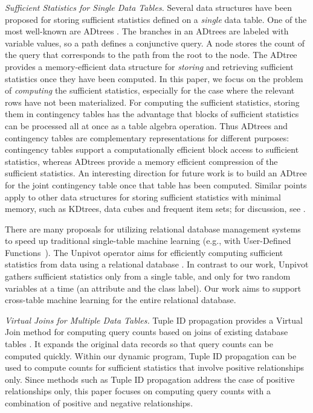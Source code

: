 \documentclass{vldb}
\begin{document}
{\em Sufficient Statistics for Single Data Tables.} Several data structures have been proposed for storing sufficient statistics defined on a {\em single} data table. 
One of the most well-known are ADtrees \cite{Moore1998}. 
The branches in an ADtrees are labeled with variable values, so a path defines a conjunctive query. 
A node stores the count of the query that corresponds to the path from the root to the node. 
The ADtree provides a memory-efficient data structure for {\em storing} and retrieving sufficient statistics once they have been computed. 
In this paper, we focus on the problem of {\em computing} the sufficient statistics, especially for the case where the relevant rows have not been materialized. 
For computing the sufficient statistics, storing them in contingency tables  has the advantage that blocks of sufficient statistics 
can be processed all at once as a table algebra operation. 
Thus ADtrees and contingency tables are complementary representations for different purposes: contingency tables support a computationally efficient block access to sufficient statistics, whereas ADtrees provide a memory efficient compression of the sufficient statistics. 
An interesting direction for future work is to build an ADtree for the joint contingency table once that table has been computed. 
Similar points apply to other data structures for storing sufficient statistics with minimal memory, such as KDtrees, data cubes and frequent item sets; for discussion,  see \cite{Moore1998}. 

There are many proposals for utilizing relational database management systems to speed up traditional single-table machine learning (e.g., with User-Defined Functions~\cite{Ordonez2010}). 
The Unpivot operator aims for efficiently computing sufficient statistics from data using a relational database \cite{unpivot_kdd98}. 
In contrast to our work, Unpivot gathers sufficient statistics only from a single table, and only for two random variables at a time (an attribute and the class label). 
Our work aims to support cross-table machine learning for the entire relational database.

{\em Virtual Joins for Multiple Data Tables.} 
Tuple ID propagation provides a Virtual Join method for computing query counts based on joins of existing database tables \cite{Yin2004}. 
It expands the original data records so that query counts can be computed quickly. 
Within our dynamic program, Tuple ID propagation can be used to compute counts for sufficient statistics that involve positive relationships only. 
Since methods such as Tuple ID propagation address the case of positive relationships only, this paper focuses on computing query counts with a combination of positive and negative relationships. 
\end{document}
